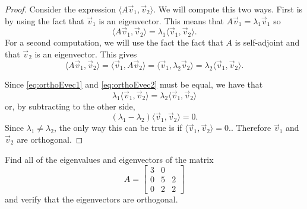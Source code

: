 \begin{proof}
Consider the expression $\langle A \vec{v}_1, \vec{v}_2 \rangle$. We will compute this two ways. First is by using the fact that $\vec{v}_1$ is an eigenvector. This means that $A\vec{v}_1 = \lambda_1\vec{v}_1$ so
\begin{equation}
\langle A\vec{v}_1, \vec{v}_2 \rangle = \lambda_1\langle \vec{v}_1, \vec{v}_2 \rangle.
\label{eq:orthoEvec1}
\end{equation}
For a second computation, we will use the fact the fact that $A$ is self-adjoint and that $\vec{v}_2$ is an eigenvector. This gives
\begin{equation}
\langle A\vec{v}_1, \vec{v}_2 \rangle = \langle \vec{v}_1, A\vec{v}_2 \rangle = \langle \vec{v}_1, \lambda_2\vec{v}_2 \rangle = \lambda_2\langle\vec{v}_1, \vec{v}_2 \rangle.
\label{eq:orthoEvec2}
\end{equation}

Since \eqref{eq:orthoEvec1} and \eqref{eq:orthoEvec2} must be equal, we have that
\[ \lambda_1 \langle \vec{v}_1, \vec{v}_2 \rangle = \lambda_2 \langle \vec{v}_1, \vec{v}_2 \rangle \] or, by subtracting to the other side, 
\[ (\lambda_1 - \lambda_2) \langle \vec{v}_1, \vec{v}_2 \rangle = 0.\]
Since $\lambda_1 \neq \lambda_2$, the only way this can be true is if $\langle \vec{v}_1, \vec{v}_2 \rangle = 0.$. Therefore $\vec{v}_1$ and $\vec{v}_2$ are orthogonal. 
\end{proof}

\begin{example}
Find all of the eigenvalues and eigenvectors of the matrix \[ A = \begin{bmatrix} 3 & 0 & \\ 0 & 5 & 2\\ 0 & 2 & 2 \end{bmatrix} \] and verify that the eigenvectors are orthogonal.
\end{example}

